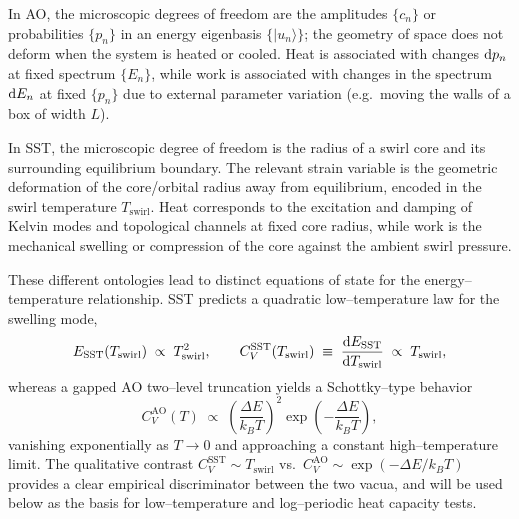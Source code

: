 \documentclass[11pt]{article}
\begin{document}
            In AO, the microscopic degrees of freedom are the amplitudes
            $\{c_n\}$ or probabilities $\{p_n\}$ in an energy eigenbasis
            $\{|u_n\rangle\}$; the geometry of space does not deform when the
            system is heated or cooled. Heat is associated with changes
            ${\rm d}p_n$ at fixed spectrum $\{E_n\}$, while work is associated
            with changes in the spectrum ${\rm d}E_n$ at fixed $\{p_n\}$ due to
            external parameter variation (e.g.\ moving the walls of a box of
            width $L$).

            In SST, the microscopic degree of freedom is the radius of a
            swirl core and its surrounding equilibrium boundary. The relevant
            strain variable is the geometric deformation
            of the core/orbital radius away from equilibrium, encoded in the
            swirl temperature $T_{\text{swirl}}$. Heat corresponds to the
            excitation and damping of Kelvin modes and topological channels
            at fixed core radius, while work is the mechanical swelling or
            compression of the core against the ambient swirl pressure.

            These different ontologies lead to distinct equations of state for
            the energy--temperature relationship. SST predicts a quadratic
            low--temperature law for the swelling mode,
            \begin{equation}
                E_{\text{SST}}(T_{\text{swirl}})\;\propto\;T_{\text{swirl}}^{2},
                \qquad
                C_V^{\text{SST}}(T_{\text{swirl}})\;\equiv\;
                \frac{{\rm d}E_{\text{SST}}}{{\rm d}T_{\text{swirl}}}
                \;\propto\;T_{\text{swirl}},
            \end{equation}
            whereas a gapped AO two--level truncation yields a Schottky--type
            behavior
            \begin{equation}
                C_V^{\text{AO}}(T)\;\propto\;\left(\frac{\Delta E}{k_B T}\right)^2
                \exp\!\left(-\frac{\Delta E}{k_B T}\right),
            \end{equation}
            vanishing exponentially as $T\to 0$ and approaching a constant
            high--temperature limit. The qualitative contrast
            $C_V^{\text{SST}}\sim T_{\text{swirl}}$ vs.\
            $C_V^{\text{AO}}\sim\exp(-\Delta E/k_B T)$ provides a clear
            empirical discriminator between the two vacua, and will be used
            below as the basis for low--temperature and log--periodic heat
            capacity tests.
\end{document}
